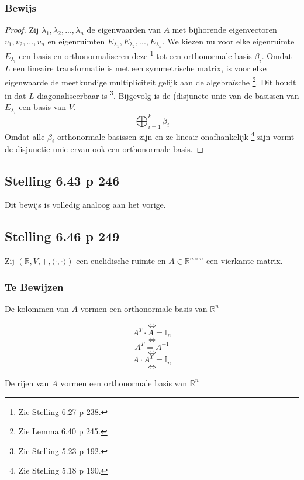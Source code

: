 \documentclass[lineaire_algebra_oplossingen.tex]{subfiles}
\begin{document}
\subsubsection*{Bewijs}
\begin{proof}
Zij $\lambda_1,\lambda_2,...,\lambda_n$ de eigenwaarden van $A$ met bijhorende eigenvectoren $v_1,v_2,...,v_n$ en eigenruimten $E_{\lambda_1},E_{\lambda_2},...,E_{\lambda_n}$.
We kiezen nu voor elke eigenruimte $E_{\lambda_i}$ een basis en orthonormaliseren deze \footnote{Zie Stelling 6.27 p 238.} tot een orthonormale basis $\beta_i$.
Omdat $L$ een lineaire transformatie is met een symmetrische matrix, is voor elke eigenwaarde de meetkundige multipliciteit gelijk aan de algebra\"ische \footnote{Zie Lemma 6.40 p 245.}.
Dit houdt in dat $L$ diagonaliseerbaar is \footnote{Zie Stelling 5.23 p 192.}.
Bijgevolg is de (disjuncte unie van de basissen van $E_{\lambda_i}$ een basis van $V$.
\[
\bigoplus_{i=1}^k \beta_i
\]
Omdat alle $\beta_i$ orthonormale basissen zijn en ze lineair onafhankelijk \footnote{Zie Stelling 5.18 p 190.} zijn vormt de disjunctie unie ervan ook een orthonormale basis.
\end{proof}


\subsection{Stelling 6.43 p 246}
Dit bewijs is volledig analoog aan het vorige.

\subsection{Stelling 6.46 p 249}
\label{6.46}
Zij $(\mathbb{R},V,+,\langle \cdot , \cdot \rangle)$ een euclidische ruimte en $A\in \mathbb{R}^{n\times n}$ een vierkante matrix.
\subsubsection*{Te Bewijzen}
\begin{center}
De kolommen van $A$ vormen een orthonormale basis van $\mathbb{R}^n$
\end{center}
\[\Leftrightarrow\]
\[A^T \cdot A = \mathbb{I}_n\]
\[\Leftrightarrow\]
\[A^T =A^{-1}\]
\[\Leftrightarrow\]
\[A \cdot A^T = \mathbb{I}_n\]
\[\Leftrightarrow\]
\begin{center}
De rijen van $A$ vormen een orthonormale basis van $\mathbb{R}^n$
\end{center}
\end{document}
